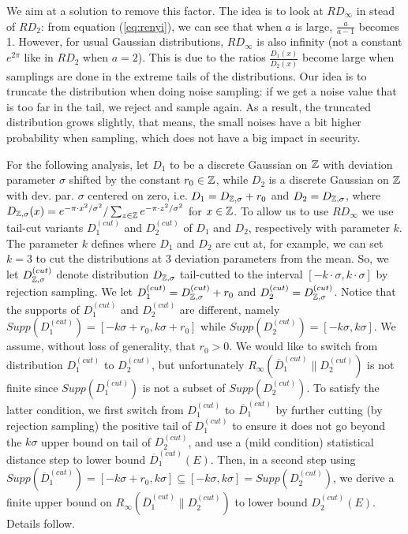 We aim at a solution to remove this factor. The idea is to look at $RD_\infty$ in stead of $RD_2$: from equation (\ref{eq:renyi}), we can see that when $a$ is large, $\frac{a}{a-1}$ becomes 1. However, for usual Gaussian distributions, $RD_\infty$ is also infinity (not a constant $e^{2\pi}$ like in $RD_2$ when $a=2$). This is due to the ratios $\frac{D_1(x)}{D_2(x)}$ become large when samplings are done in the extreme tails of the distributions. Our idea is to truncate the distribution when doing noise sampling: if we get a noise value that is too far in the tail, we reject and sample again. As a result, the truncated distribution grows slightly, that means, the small noises have a bit higher probability when sampling, which does not have a big impact in security.

For the following analysis, let $D_1$ to be a discrete Gaussian on $\mathbb{Z}$ with deviation parameter $\sigma$ shifted by the constant $r_0 \in \mathbb{Z}$, while $D_2$ is a discrete Gaussian on $\mathbb{Z}$ with dev. par. $\sigma$ centered on zero, i.e. $D_1 = D_{\mathbb{Z},\sigma} + r_0$ and $D_2 = D_{\mathbb{Z},\sigma}$, where $D_{\mathbb{Z},\sigma}(x) = e^{-\pi \cdot x^2/\sigma^2}/\sum_{z \in \mathbb{Z}} e^{-\pi \cdot z^2/\sigma^2}$ for $x \in \mathbb{Z}$. To allow us to use $RD_{\infty}$ we use tail-cut variants $D_1^{(cut)}$ and $D_2^{(cut)}$ of $D_1$ and $D_2$, respectively with parameter $k$. The parameter $k$ defines where $D_1$ and $D_2$ are cut at, for example, we can set $k=3$ to cut the distributions at 3 deviation parameters from the mean. So, we let $D_{\mathbb{Z},\sigma}^{(cut)}$ denote distribution $D_{\mathbb{Z},\sigma}$ tail-cutted to the interval $[-k \cdot \sigma, k \cdot \sigma]$ by rejection sampling. We let $D_1^{(cut)} = D_{\mathbb{Z},\sigma}^{(cut)} + r_0$ and $D_2^{(cut)} = D_{\mathbb{Z},\sigma}^{(cut)}$. Notice that the supports of $D_1^{(cut)}$ and $D_2^{(cut)}$ are different, namely $Supp(D_1^{(cut)}) = [-k\sigma+r_0,k\sigma+r_0]$ while $Supp(D_2^{(cut)}) = [-k\sigma,k\sigma]$. We assume, without loss of generality, that $r_0 > 0$. We would like to switch from distribution $D_1^{(cut)}$ to $D_2^{(cut)}$, but unfortunately $R_\infty(\overline{D}_1^{(cut)}\|D_2^{(cut)})$ is not finite since $Supp(D_1^{(cut)})$ is not a subset of $Supp(D_2^{(cut)})$. To satisfy the latter condition, we first switch from $D_1^{(cut)}$ to $\overline{D}_1^{(cut)}$ by further cutting (by rejection sampling) the positive tail of $D_1^{(cut)}$ to ensure it does not go beyond the $k \sigma$ upper bound on tail of $D_2^{(cut)}$, and use a (mild condition) statistical distance step to lower bound $\overline{D}_1^{(cut)}(E)$. Then, in a second step using $Supp(\overline{D}_1^{(cut)})=[-k\sigma+r_0, k\sigma] \subseteq [-k\sigma,k\sigma] = Supp(D_2^{(cut)})$, we derive a finite upper bound on $R_\infty(\overline{D}_1^{(cut)}\|D_2^{(cut)})$ to lower bound $D_2^{(cut)}(E)$. Details follow.
